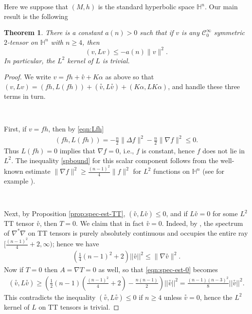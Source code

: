 \documentclass[10pt,reqno]{amsart}
\newtheorem{theorem}{Theorem}[section]
\newcommand{\ttv}{\stackrel{\circ}{v}}
\begin{document}
Here we suppose that $(M, h)$ is the standard hyperbolic space $\mathbb H^n$.  Our main result is the following
\begin{theorem} \label{thm:main1nc} There is a constant $a(n) > 0$ such that if $v$ is any $\mathcal C^\infty_0$ symmetric $2$-tensor on $\mathbb H^n$ with $n \geq 4$, then 
\begin{equation}
(v, Lv) \leq -a(n) \|v\|^2.
\label{spbound}
\end{equation}
In particular, the $L^2$ kernel of $L$ is trivial. 
\end{theorem}
\begin{proof}
We write $v = fh + \ttv + K \alpha$ as above so that $(v, Lv) = (fh, L(fh)) + (\ttv, L \ttv) + (K\alpha, L K \alpha)$, and handle these three terms in turn.

\ 

First, if $v = f h$, then by \eqref{eqn:Lfh}
\begin{align} \label{eqn:hyp-est-fnc}
(f h, L(fh)) = 
-\frac{n}{2} \| \Delta f \|^2 - \frac{n}{2} \|\nabla f\|^2 \leq 0.
\end{align}
Thus $L( fh) = 0$ implies that $\nabla f = 0$, i.e., $f$ is constant, hence $f$ does not lie in $L^2$.  The inequality \eqref{spbound} for this scalar component follows from the well-known estimate
$\| \nabla f \|^2 \ge \frac{(n-1)^2}{4} \|f\|^2$ for $L^2$ functions on $\mathbb H^n$ (see for example \cite{McKean}).

\ 

Next, by Proposition \ref{prop:spec-est-TT}, $( \ttv, L\ttv) \leq 0$, and if $L \ttv = 0$ for some $L^2$ TT tensor $\ttv$, then $T = 0$. We claim that in fact $\ttv = 0$. 
Indeed, by \cite[Remark 6.2]{Delay}, the spectrum of $\nabla^*\nabla$ on TT tensors is purely absolutely continuous and occupies the entire ray $[ \frac{(n-1)^2}{4} + 2,\infty)$; hence we have
\begin{align} \label{eqn:hyp-lap-spec-est}
(\tfrac14 (n-1)^2 + 2) ||\ttv||^2 \leq \| \nabla \ttv \|^2. 
\end{align}
Now if $T = 0$ then $A = \nabla T = 0$ as well, so that \eqref{eqn:spec-est-0} becomes
\begin{align*}
(\ttv, L\ttv) \geq \left( \frac12 (n-1) ( \frac{(n-1)^2}{4} + 2) - \frac{n(n-1)}{2}\right) ||\ttv||^2 = \frac{ (n-1)(n-3)^2}{8} ||\ttv||^2.
\end{align*}
This contradicts the inequality $(\ttv, L\ttv) \leq 0$ if $n \geq 4$ unless $\ttv = 0$, hence the $L^2$ kernel of $L$ on TT tensors is trivial. 


\end{proof}
\end{document}
